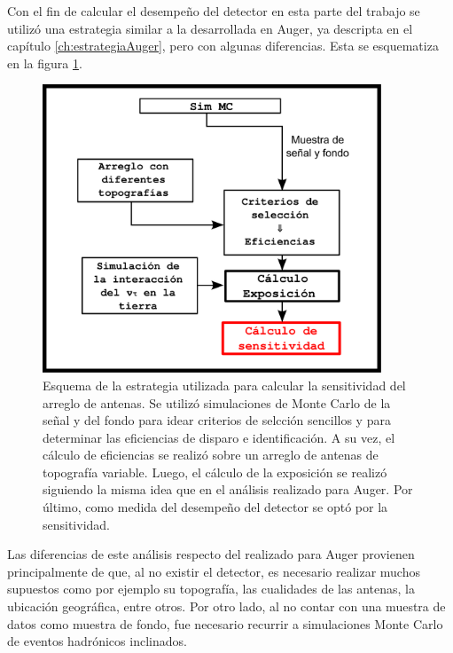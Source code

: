 Con el fin de calcular el desempe\~no del detector en esta parte del trabajo se utiliz\'o una estrategia similar a la desarrollada en Auger, ya descripta en el cap\'itulo \ref{ch:estrategiaAuger}, pero con algunas diferencias. Esta se esquematiza en la figura \ref{fig:analysisSchemaRadio}.
%
\begin{figure}[h!]
	\begin{center}
		\includegraphics[width=0.9\textwidth]{fig/motivacionRadio/analysisSchemaRadio}
		\caption{Esquema de la estrategia utilizada para calcular la sensitividad del arreglo de antenas. Se utiliz\'o simulaciones de Monte Carlo de la se\~nal y del fondo para idear criterios de selcci\'on sencillos y para determinar las eficiencias de disparo e identificaci\'on. A su vez, el c\'alculo de eficiencias se realiz\'o sobre un arreglo de antenas de topograf\'ia variable. Luego, el c\'alculo de la exposici\'on se realiz\'o siguiendo la misma idea que en el an\'alisis realizado para Auger. Por \'ultimo, como medida del desempe\~no del detector se opt\'o por la sensitividad.}
		\label{fig:analysisSchemaRadio}
	\end{center}
\end{figure}
%
Las diferencias de este an\'alisis respecto del realizado para Auger provienen principalmente de que, al no existir el detector, es necesario realizar muchos supuestos como por ejemplo su topograf\'ia, las cualidades de las antenas, la ubicaci\'on geogr\'afica, entre otros.
Por otro lado, al no contar con una muestra de datos como muestra de fondo, fue necesario recurrir a simulaciones Monte Carlo de eventos hadr\'onicos inclinados.


